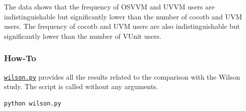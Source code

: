 \documentclass[]{article}
\begin{document}
The data shows that the frequency of OSVVM and UVVM users are indistinguishable but significantly lower than the number of cocotb and UVM users. The frequency of cocotb and UVM users are also indistinguishable but significantly lower than the number of VUnit users.

\hypertarget{how-to}{%
\subsubsection{How-To}\label{how-to}}

\href{https://github.com/LarsAsplund/github-facts/tree/main/py/wilson.py}{\texttt{wilson.py}} provides all the results related to the comparison with the Wilson study. The script is called without any arguments.

\begin{verbatim}
python wilson.py
\end{verbatim}

\printbibliography
\end{document}
